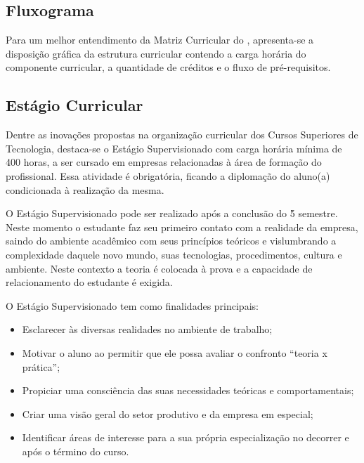\documentclass{paper}
\begin{document}
\subsection{Fluxograma}
Para um melhor entendimento da Matriz Curricular do \NOMECURSO, apresenta-se a disposição gráfica da estrutura curricular contendo a carga horária do componente curricular, a quantidade de créditos e o fluxo de pré-requisitos.

\if{}
	
\else
	
\fi

\subsection{Estágio Curricular}

Dentre as inovações propostas na organização curricular dos Cursos Superiores de Tecnologia, destaca-se o Estágio Supervisionado com carga horária mínima de 400 horas, a ser cursado em empresas relacionadas à área de formação do profissional. Essa atividade é obrigatória, ficando a diplomação do aluno(a) condicionada à realização da mesma.

O Estágio Supervisionado pode ser realizado após a conclusão do 5{\r{}} semestre. Neste momento o estudante faz seu primeiro contato com a realidade da empresa, saindo do ambiente acadêmico com seus princípios teóricos e vislumbrando a complexidade daquele novo mundo, suas tecnologias, procedimentos, cultura e ambiente. Neste contexto a teoria é colocada à prova e a capacidade de relacionamento do estudante é exigida.

O Estágio Supervisionado tem como finalidades principais:

\begin{itemize}
\item Esclarecer às diversas realidades no ambiente de trabalho;
\item Motivar o aluno ao permitir que ele possa avaliar o confronto “teoria x prática”;
\item Propiciar uma consciência das suas necessidades teóricas e comportamentais;
\item Criar uma visão geral do setor produtivo e da empresa em especial;
\item Identificar áreas de interesse para a sua própria especialização no decorrer e após o término do curso.
\end{itemize}
\end{document}
